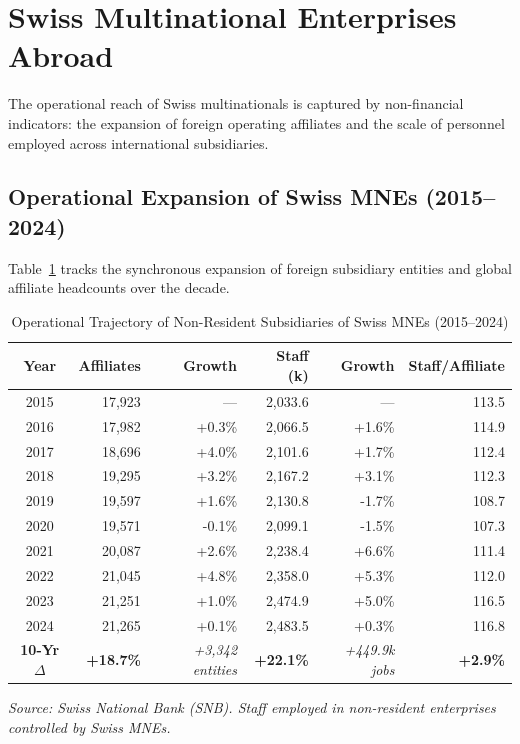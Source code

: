 
\section{Swiss Multinational Enterprises Abroad}

The operational reach of Swiss multinationals is captured by non-financial indicators: the expansion of foreign operating affiliates and the scale of personnel employed across international subsidiaries.

\subsection{Operational Expansion of Swiss MNEs (2015--2024)}

Table~\ref{tab:combined_mne_abroad} tracks the synchronous expansion of foreign subsidiary entities and global affiliate headcounts over the decade.

\begin{table}[H]
\centering
\small
\caption{Operational Trajectory of Non-Resident Subsidiaries of Swiss MNEs (2015--2024)}
\label{tab:combined_mne_abroad}
\setlength{\tabcolsep}{4.5pt}
\renewcommand{\arraystretch}{1.12}
\begin{tabular}{c r r r r r}
\toprule
\rowcolor{tableheadbg}
\textbf{Year} & \textbf{Affiliates} & \textbf{Growth} & \textbf{Staff (k)} & \textbf{Growth} & \textbf{Staff/Affiliate} \\
\midrule
2015 & 17,923 & --- & 2,033.6 & --- & 113.5 \\
\rowcolor{tablerowbg}
2016 & 17,982 & +0.3\% & 2,066.5 & +1.6\% & 114.9 \\
2017 & 18,696 & +4.0\% & 2,101.6 & +1.7\% & 112.4 \\
\rowcolor{tablerowbg}
2018 & 19,295 & +3.2\% & 2,167.2 & +3.1\% & 112.3 \\
2019 & 19,597 & +1.6\% & 2,130.8 & -1.7\% & 108.7 \\
\rowcolor{tablerowbg}
2020 & 19,571 & -0.1\% & 2,099.1 & -1.5\% & 107.3 \\
2021 & 20,087 & +2.6\% & 2,238.4 & +6.6\% & 111.4 \\
\rowcolor{tablerowbg}
2022 & 21,045 & +4.8\% & 2,358.0 & +5.3\% & 112.0 \\
2023 & 21,251 & +1.0\% & 2,474.9 & +5.0\% & 116.5 \\
\rowcolor{tablerowbg}
2024 & 21,265 & +0.1\% & 2,483.5 & +0.3\% & 116.8 \\
\midrule
\textbf{10-Yr $\Delta$} & \textbf{+18.7\%} & \textit{+3,342 entities} & \textbf{+22.1\%} & \textit{+449.9k jobs} & \textbf{+2.9\%} \\
\bottomrule
\end{tabular}
\par\vspace{0.3em}
\footnotesize
\textit{Source: Swiss National Bank (SNB). Staff employed in non-resident enterprises controlled by Swiss MNEs.}
\normalsize
\end{table}

